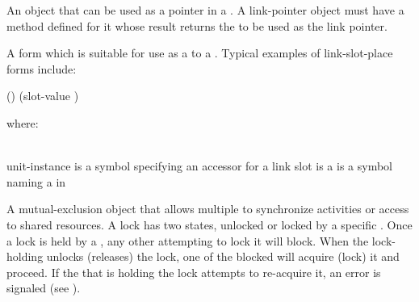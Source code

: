 \begin{glossary-list}

%
%
%
%
%
%
%
%
An object that can be used as a pointer in a .  A
link-pointer object must have a 
method defined for it whose result returns the  to be
used as the link pointer.


%
%
%
%
A form which is suitable for use as a  to a
.  Typical examples of link-slot-place forms include:
%
\W\supp\notpretop
\T\vspace{4pt}
\begin{example}
  ()
  (slot-value )
\end{example}
where:
\W\\~\\
\begin{args}{unit-instance}
 is a symbol specifying an accessor  for
  a link slot
 is a 
 is a symbol naming a  in
\end{args}


\glent[lock] 
%
%
%
%
A mutual-exclusion object that allows multiple  to
synchronize activities or access to shared resources. A lock has two
states, unlocked or locked by a specific . Once a lock
is held by a , any other  attempting to
lock it will block. When the lock-holding  unlocks
(releases) the lock, one of the blocked  will acquire
(lock) it and proceed.  If the  that is holding the lock
attempts to re-acquire it, an error is signaled (see
).



\end{glossary-list}
